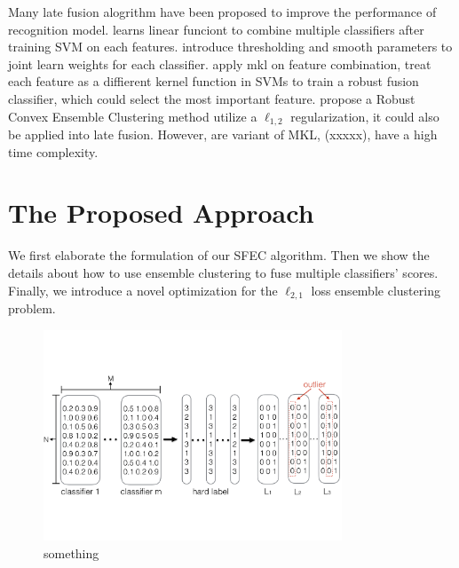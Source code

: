 \documentclass[letterpaper]{article}
\begin{document}
Many late fusion alogrithm have been proposed to improve the performance of recognition model. \cite{gehler2009feature} learns linear funciont to combine multiple classifiers after training SVM on each features. \cite{xuiccv2013feature} introduce thresholding and smooth parameters to joint learn weights for each classifier. \cite{Rakotomamonjy2008Simplemkl} apply mkl on feature combination, treat each feature as a diffierent kernel function in SVMs to train a robust fusion classifier, which could select the most important feature. \cite{gaoijcai2016robust} propose a Robust Convex Ensemble Clustering method utilize a $\ell_{1,2}$ regularization, it could also be applied into late fusion.
However, \cite{gehler2009feature,xuiccv2013feature,Rakotomamonjy2008Simplemkl} are variant of MKL, (xxxxx), \cite{gaoijcai2016robust} have a high time complexity.



\section{The Proposed Approach}
We first elaborate the formulation of our SFEC algorithm. Then we show the details about how to use ensemble clustering to fuse multiple classifiers' scores. Finally, we introduce a novel optimization for the $\ell_{2,1}$ loss ensemble clustering problem.

\begin{figure}[t]
\centering\includegraphics[width=3.5in]{resource/framework.pdf}
\caption{something}\label{fig:framework}
\end{figure}
\end{document}
